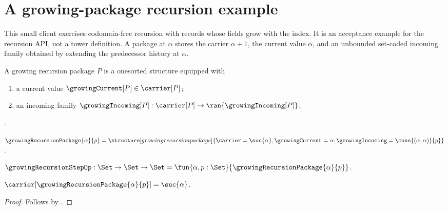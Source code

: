 

\section{A growing-package recursion example}

This small client exercises codomain-free recursion with records whose fields
grow with the index.  It is an acceptance example for the recursion API, not
a tower definition.  A package at $\alpha$ stores the carrier
$\alpha+1$, the current value $\alpha$, and an unbounded set-coded incoming
family obtained by extending the predecessor history at $\alpha$.

\begin{struct}\label{growing_recursion_package}
    A growing recursion package $P$ is a onesorted structure equipped with
    \begin{enumerate}
        \item\label{growing_recursion_package_current}
            a current value
            $\growingCurrent[P]\in\carrier[P]$;
        \item\label{growing_recursion_package_incoming}
            an incoming family
            $\growingIncoming[P]:
                \carrier[P]\to\ran{\growingIncoming[P]}$;
    \end{enumerate}.
\end{struct}

\begin{definition}\label{growing_recursion_package_op}
    $\growingRecursionPackage{\alpha}{p}=
        \structure[growing recursion package]{
            \carrier=\suc{\alpha},
            \growingCurrent=\alpha,
            \growingIncoming=\cons{(\alpha,\alpha)}{p}
        }$.
\end{definition}

\begin{definition}\label{growing_recursion_step_op}
    $\growingRecursionStepOp:\Set\to\Set\to\Set
        =\fun{\alpha,p:\Set}{
                \growingRecursionPackage{\alpha}{p}}$.
\end{definition}

\begin{proposition}\label{growing_recursion_package_carrier}
    $\carrier[\growingRecursionPackage{\alpha}{p}]=\suc{\alpha}$.
\end{proposition}
\begin{proof}
    Follows by .
\end{proof}

